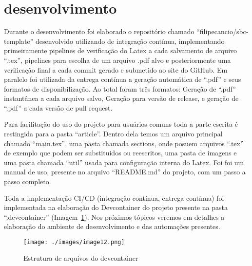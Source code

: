 \section{desenvolvimento}

Durante o desenvolvimento foi elaborado o repositório chamado ``filipecancio/sbc-template'' desenvolvido utilizando de integração contínua, implementando primeiramente pipelines de verificação do Latex a cada salvamento de arquivo ``.tex'', pipelines para escolha de um arquivo .pdf alvo e posteriormente uma verificação final a cada commit gerado e submetido ao site do GitHub. Em paralelo foi utilizada da entrega contínua a geração automática de ``.pdf'' e seus formatos de disponibilização. Ao total foram três formatos: Geração de ``.pdf'' instantânea a cada arquivo salvo, Geração para versão de release, e geração de ``.pdf'' a cada versão de pull request.

Para facilitação do uso do projeto para usuários comuns toda a parte escrita é restingida para a pasta ``article''. Dentro dela temos um arquivo principal chamado ``main.tex'', uma pasta chamada sections, onde posuem arquivos ``.tex'' de exemplo que podem ser substituidos ou reescritos, uma pasta de imagens e uma pasta chamada ``util'' usada para configuração interna do Latex.
Foi foi um manual de uso, presente no arquivo ``README.md'' do projeto, com um passo a passo completo.

Toda a implementação CI/CD (integração contínua, entrega contínua) foi implementada na elaboração do Devcontainer do projeto presente na pasta ``.devcontainer'' (Imagem~\ref{fig:image12}). Nos próximos tópicos veremos em detalhes a elaboração do ambiente de desenvolvimento e das automações
presentes.

\begin{figure}[ht]
	\centering
	\texttt{[image: ./images/image12.png]}
	\caption{Estrutura de arquivos do devcontainer}
	\label{fig:image12}
\end{figure}
